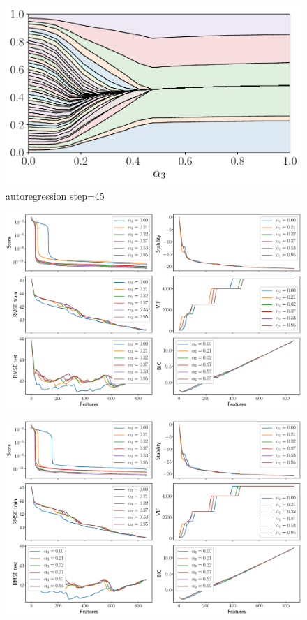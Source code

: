 \documentclass[12pt,twoside]{article}
\begin{document}
\begin{figure}
	\includegraphics[width=\linewidth]{figs/features_vs_alpha_ecog_45.pdf}
	\caption{autoregression step=45}
\end{figure}

\begin{figure}
	\includegraphics[width=\linewidth]{figs/ecog_3_metrics.eps}
	\caption{}
\end{figure}

\begin{figure}
	\includegraphics[width=\linewidth]{figs/ecog_9_metrics.eps}
	\caption{}
\end{figure}
\end{document}
